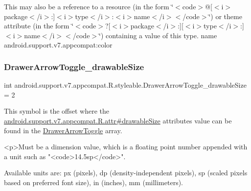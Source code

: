 This may also be a reference to a resource (in the form \char`\"{}$<$code$>$@\mbox{[}$<$i$>$package$<$/i$>$\+:\mbox{]}$<$i$>$type$<$/i$>$\+:$<$i$>$name$<$/i$>$$<$/code$>$\char`\"{}) or theme attribute (in the form \char`\"{}$<$code$>$?\mbox{[}$<$i$>$package$<$/i$>$\+:\mbox{]}\mbox{[}$<$i$>$type$<$/i$>$\+:\mbox{]}$<$i$>$name$<$/i$>$$<$/code$>$\char`\"{}) containing a value of this type.  name android.\+support.\+v7.\+appcompat\+:color \mbox{\label{classandroid_1_1support_1_1v7_1_1appcompat_1_1R_1_1styleable_a579e9b0e2747d0ee8099120f0755be5e}} 
\subsubsection{\texorpdfstring{Drawer\+Arrow\+Toggle\+\_\+drawable\+Size}{DrawerArrowToggle\_drawableSize}}
{\footnotesize\ttfamily int android.\+support.\+v7.\+appcompat.\+R.\+styleable.\+Drawer\+Arrow\+Toggle\+\_\+drawable\+Size = 2\hspace{0.3cm}{\ttfamily [static]}}

This symbol is the offset where the \hyperlink{classandroid_1_1support_1_1v7_1_1appcompat_1_1R_1_1attr_a3b065ae622136249bbdcb92a222420b6}{android.\+support.\+v7.\+appcompat.\+R.\+attr\#drawable\+Size} attribute\textquotesingle{}s value can be found in the \hyperlink{classandroid_1_1support_1_1v7_1_1appcompat_1_1R_1_1styleable_a7bd3ecc07eb763b454c40c0871959a35}{Drawer\+Arrow\+Toggle} array.

\begin{DoxyVerb}      <p>Must be a dimension value, which is a floating point number appended with a unit such as "<code>14.5sp</code>".
\end{DoxyVerb}
 Available units are\+: px (pixels), dp (density-\/independent pixels), sp (scaled pixels based on preferred font size), in (inches), mm (millimeters). 

